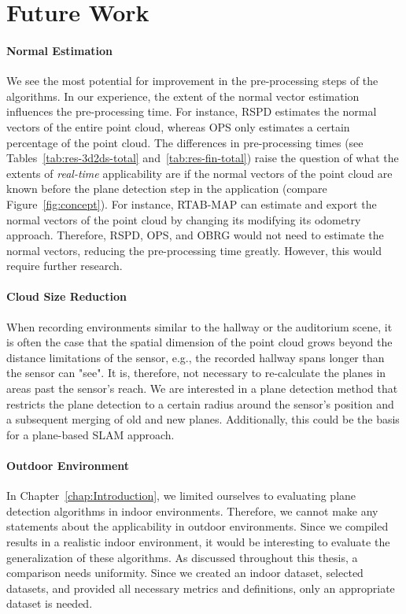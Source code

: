 \documentclass[main.tex]{subfiles}
\begin{document}
\section{Future Work}
\paragraph{Normal Estimation}
We see the most potential for improvement in the pre-processing steps of the algorithms. In our experience, the extent of the normal vector estimation influences the pre-processing time. For instance, RSPD estimates the normal vectors of the entire point cloud, whereas OPS only estimates a certain percentage of the point cloud. The differences in pre-processing times (see Tables~\ref{tab:res-3d2ds-total} and~\ref{tab:res-fin-total}) raise the question of what the extents of \textit{real-time} applicability are if the normal vectors of the point cloud are known before the plane detection step in the application (compare Figure~\ref{fig:concept}). For instance, RTAB-MAP can estimate and export the normal vectors of the point cloud by changing its modifying its odometry approach. Therefore, RSPD, OPS, and OBRG would not need to estimate the normal vectors, reducing the pre-processing time greatly. However, this would require further research.

\paragraph{Cloud Size Reduction}
When recording environments similar to the hallway or the auditorium scene, it is often the case that the spatial dimension of the point cloud grows beyond the distance limitations of the sensor, e.g., the recorded hallway spans longer than the sensor can "see". It is, therefore, not necessary to re-calculate the planes in areas past the sensor's reach. We are interested in a plane detection method that restricts the plane detection to a certain radius around the sensor's position and a subsequent merging of old and new planes. Additionally, this could be the basis for a plane-based SLAM approach.

\paragraph{Outdoor Environment}
In Chapter~\ref{chap:Introduction}, we limited ourselves to evaluating plane detection algorithms in indoor environments. Therefore, we cannot make any statements about the applicability in outdoor environments. Since we compiled results in a realistic indoor environment, it would be interesting to evaluate the generalization of these algorithms. As discussed throughout this thesis, a comparison needs uniformity. Since we created an indoor dataset, selected datasets, and provided all necessary metrics and definitions, only an appropriate dataset is needed.
\end{document}
